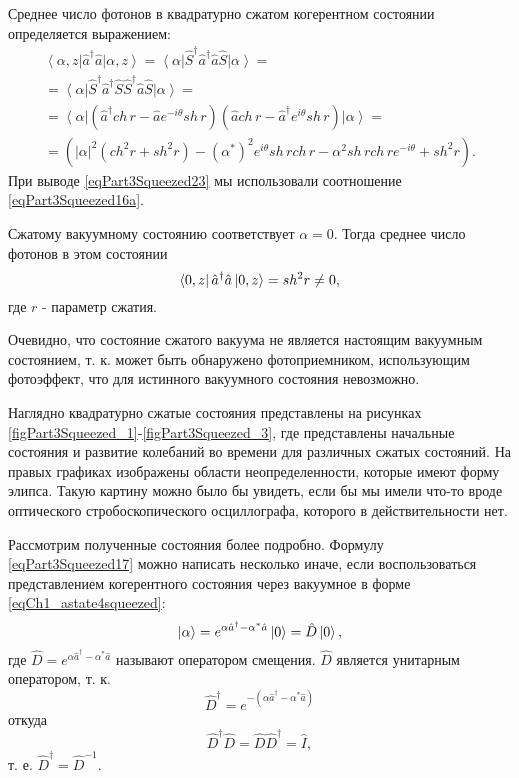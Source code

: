 Среднее число фотонов в квадратурно сжатом когерентном состоянии
определяется выражением:
\begin{eqnarray}
\left<\alpha, z\right|\hat{a}^{\dag}\hat{a}\left|\alpha, z\right> =
\left<\alpha\right|\hat{S}^{\dag}\hat{a}^{\dag}\hat{a}\hat{S}\left|\alpha\right>
=
\nonumber \\
=
\left<\alpha\right|\hat{S}^{\dag}\hat{a}^{\dag}\hat{S}\hat{S}^{\dag}\hat{a}\hat{S}\left|\alpha\right>
= 
\nonumber \\
=
\left<\alpha\right|
\left(\hat{a}^{\dag} ch\,r - \hat{a}e^{-i\theta}sh\,r\right)
\left(\hat{a} ch\,r - \hat{a}^{\dag} e^{i\theta}sh\,r\right)
\left|\alpha\right> = 
\nonumber \\
=
\left(
\left|\alpha\right|^2\left(ch^2 r + sh^2 r\right) -
\left(\alpha^{*}\right)^2
e^{i\theta} sh\,r ch\,r - 
\alpha^2 sh\,r ch\,r e^{- i\theta} + sh^2 r
\right).
\label{eqPart3Squeezed23}
\end{eqnarray}
При выводе \eqref{eqPart3Squeezed23} мы использовали соотношение
\eqref{eqPart3Squeezed16a}.

Сжатому вакуумному состоянию соответствует $\alpha = 0$. Тогда среднее
число фотонов в этом состоянии
\begin{equation}
\bra{0, z}\hat{a}^{\dag}\hat{a}\ket{0, z} =
sh^2 r \ne 0,
\label{eqPart3Squeezed24}
\end{equation}
где $r$ - параметр сжатия.

Очевидно, что состояние сжатого вакуума не является настоящим
вакуумным состоянием, т. к. может быть обнаружено фотоприемником,
использующим фотоэффект, что для истинного вакуумного состояния
невозможно.




%
%

Наглядно квадратурно сжатые  состояния представлены на рисунках
\ref{figPart3Squeezed_1}-\ref{figPart3Squeezed_3}, где представлены
начальные состояния и развитие колебаний во 
времени для различных сжатых состояний. На правых графиках изображены
области неопределенности, которые имеют форму элипса. Такую картину
можно было бы увидеть, если бы мы имели что-то вроде оптического
стробоскопического осциллографа, которого в действительности нет.

Рассмотрим полученные состояния более подробно. Формулу
\eqref{eqPart3Squeezed17} можно написать несколько иначе, если
воспользоваться представлением когерентного состояния через вакуумное
в форме \eqref{eqCh1_astate4squeezed}:
\begin{equation}
\left|\alpha\right> =  
e^{\alpha \hat{a}^{\dag} - \alpha^{*} \hat{a}}\ket{0} = 
\hat{D}\ket{0},
\nonumber
\end{equation}
где $\hat{D} = e^{\alpha \hat{a}^{\dag} - \alpha^{*} \hat{a}}$ называют
оператором смещения. $\hat{D}$ является унитарным оператором, т. к. 
\[
\hat{D}^{\dag} = e^{-\left(\alpha \hat{a}^{\dag} - \alpha^{*} \hat{a}\right)}
\]
откуда
\[
\hat{D}^{\dag} \hat{D} = \hat{D} \hat{D}^{\dag} =\hat{I},
\]
т. е. $\hat{D}^{\dag} = \hat{D}^{-1}$.

